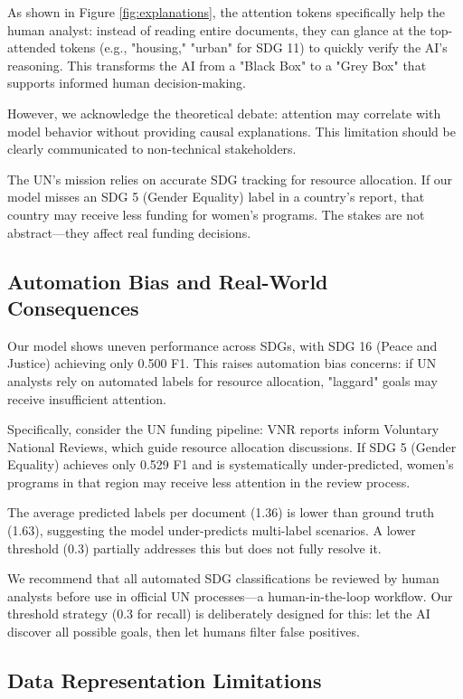 \documentclass[12pt,a4paper]{article}
\begin{document}
As shown in Figure \ref{fig:explanations}, the attention tokens specifically help the human analyst: instead of reading entire documents, they can glance at the top-attended tokens (e.g., "housing," "urban" for SDG 11) to quickly verify the AI's reasoning. This transforms the AI from a "Black Box" to a "Grey Box" that supports informed human decision-making.

However, we acknowledge the theoretical debate: attention may correlate with model behavior without providing causal explanations. This limitation should be clearly communicated to non-technical stakeholders.

The UN's mission relies on accurate SDG tracking for resource allocation. If our model misses an SDG 5 (Gender Equality) label in a country's report, that country may receive less funding for women's programs. The stakes are not abstract—they affect real funding decisions.

\subsection{Automation Bias and Real-World Consequences}

Our model shows uneven performance across SDGs, with SDG 16 (Peace and Justice) achieving only 0.500 F1. This raises automation bias concerns: if UN analysts rely on automated labels for resource allocation, "laggard" goals may receive insufficient attention.

Specifically, consider the UN funding pipeline: VNR reports inform Voluntary National Reviews, which guide resource allocation discussions. If SDG 5 (Gender Equality) achieves only 0.529 F1 and is systematically under-predicted, women's programs in that region may receive less attention in the review process.

The average predicted labels per document (1.36) is lower than ground truth (1.63), suggesting the model under-predicts multi-label scenarios. A lower threshold (0.3) partially addresses this but does not fully resolve it.

We recommend that all automated SDG classifications be reviewed by human analysts before use in official UN processes—a human-in-the-loop workflow. Our threshold strategy (0.3 for recall) is deliberately designed for this: let the AI discover all possible goals, then let humans filter false positives.

\subsection{Data Representation Limitations}
\end{document}
